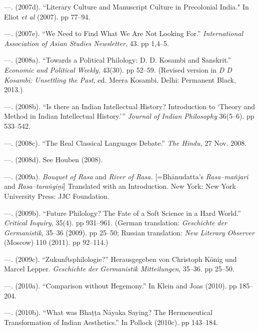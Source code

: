 \begin{thebibliography}{99}
 \item —. (2007d). “Literary Culture and Manuscript Culture in Precolonial India." In Eliot \textit{et al} (2007). pp 77–94.

 \item —. (2007e). “We Need to Find What We Are Not Looking For.” \textit{International Association of Asian Studies Newsletter}, 43. pp 1,4–5.

 \item —. (2008a). “Towards a Political Philology: D. D. Kosambi and Sanskrit.” \textit{Economic and Political Weekly}, 43(30). pp 52–59. (Revised version in \textit{D D Kosambi: Unsettling the Past}, ed. Meera Kosambi. Delhi: Permanent Black, 2013.)

 \item —. (2008b). “Is there an Indian Intellectual History? Introduction to ‘Theory and Method in Indian Intellectual History.’” \textit{Journal of Indian Philosophy} 36(5–6). pp 533–542.

 \item —. (2008c). “The Real Classical Languages Debate.” \textit{The Hindu,} 27 Nov. 2008.

 \item —. (2008d). See Houben (2008).

 \item —. (2009a).\textit{ Bouquet of Rasa }and\textit{ River of Rasa. }[=Bhānudatta’s \textit{Rasa–mañjarī} and \textit{Rasa–taraṅgiṇī}] Translated with an Introduction. New York: New York University Press: JJC Foundation\textit{.}

 \item —. (2009b). “Future Philology? The Fate of a Soft Science in a Hard World.” \textit{Critical Inquiry}, 35(4). pp 931–961. (German translation: \textit{Geschichte der Germanistik}, 35–36 (2009). pp 25–50; Russian translation: \textit{New Literary Observer }(Moscow) 110 (2011). pp 92–114.) 

 \item —. (2009c). “Zukunftsphilologie?” Herausgegeben von Christoph König und Marcel Lepper. \textit{Geschichte der Germanistik Mitteilungen}, 35–36. pp 25–50.

 \item —. (2010a). “Comparison without Hegemony.” In Klein and Joas (2010). pp 185–204.

 \item —. (2010b). “What was Bhaṭṭa Nāyaka Saying? The Hermeneutical Transformation of Indian Aesthetics.” In Pollock (2010c). pp 143–184.


\end{thebibliography}
